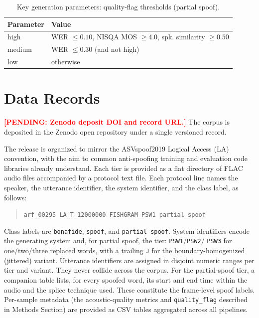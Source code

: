 \documentclass[11pt]{article}
\newcommand{\PENDING}[1]{\textcolor{red}{\textbf{[PENDING: #1]}}}
\begin{document}
\begin{table}[H]
\centering
\caption{Key generation parameters: quality-flag thresholds (partial spoof).}
\label{tab:params-quality}
\small
\begin{tabular}{p{4.9cm}p{7.2cm}}
\toprule
\textbf{Parameter} & \textbf{Value} \\
\midrule
high & WER $\leq 0.10$, NISQA MOS $\geq 4.0$, spk. similarity $\geq 0.50$ \\
medium & WER $\leq 0.30$ (and not high) \\
low & otherwise \\
\bottomrule
\end{tabular}
\end{table}

\FloatBarrier
\section*{Data Records}



\PENDING{Zenodo deposit DOI and record URL.} The corpus is deposited in
the Zenodo open repository under a single versioned record.

The release is organized to mirror the ASVspoof2019 Logical Access (LA)
convention, with the aim to common anti-spoofing training and evaluation code libraries already
understand. Each tier is provided as a flat directory of FLAC audio
files accompanied by a protocol text file. Each protocol line names the
speaker, the utterance identifier, the system identifier, and the
class label, as follows:

\begin{quote}\small
\texttt{arf\_00295\ LA\_T\_12000000\ FISHGRAM\_PSW1\ partial\_spoof}
\end{quote}

Class labels are \texttt{bonafide}, \texttt{spoof}, and
\texttt{partial\_spoof}. System identifiers encode the generating system
and, for partial spoof, the tier: \texttt{PSW1}/\texttt{PSW2}/%
\texttt{PSW3} for one/two/three replaced words, with a trailing
\texttt{J} for the boundary-homogenized (jittered) variant. Utterance
identifiers are assigned in disjoint numeric ranges per tier and
variant. They never collide across the corpus. For the
partial-spoof tier, a companion table lists, for every spoofed word, its
start and end time within the audio and the splice
technique used. These constitute the frame-level spoof labels. Per-sample
metadata (the acoustic-quality metrics and \texttt{quality\_flag}
described in Methods Section) are provided as CSV tables aggregated across all pipelines.
\end{document}
